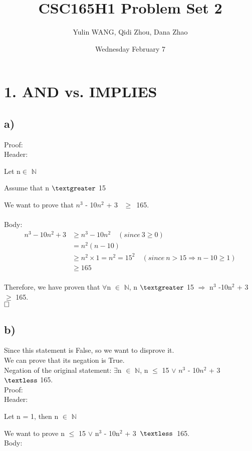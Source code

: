 \documentclass[12pt]{article}
\title{CSC165H1 Problem Set 2}
\author{Yulin WANG, Qidi Zhou, Dana Zhao}
\date{Wednesday February 7}
\begin{document}
\maketitle

\section*{1. AND vs. IMPLIES} 
\vspace{20pt}
\vspace{20pt}

\subsection*{a)}
Proof: \\
Header:

Let n$\in$ $\mathbb{N}$

Assume that n $\textgreater$ 15

We want to prove that $n^3$ - 10$n^2$ + 3 \ $\geq$\ 165. \\
~\\
Body:
\begin{align*}
n^3-10n^2+3 &\geq n^3 - 10n^2  \quad(since \ 3 \geq 0) \\
&= n^2(n-10) \\
&\geq  n^2 \times 1 = n^2 = 15^2 \quad (since \ n > 15  \Rightarrow n - 10 \geq 1) \\
&\geq 165
\end{align*}\\
Therefore, we have proven that $\forall$n $\in$ $\mathbb{N}$, n $\textgreater$ 15 $\Rightarrow$ n$^3$ -10n$^2$ + 3\ $\geq$ 165. \\

$\hfill\square$ 
\newpage
\subsection*{b)}
Since this statement is False, so we want to disprove it.\\
We can prove that its negation is True.\\
Negation of the original statement: $\exists$n $\in$ $\mathbb{N}$, n $\leq$ 15 $\vee$ $n^3$ - 10$n^2$ + 3\ $\textless$ 165.\\
Proof:\\
Header:

Let n = 1, then n $\in$ $\mathbb{N}$

We want to prove  n $\leq$ 15 $\vee$ n$^3$ - 10n$^2$ + 3\ $\textless$\ 165.\\
Body:
\end{document}
